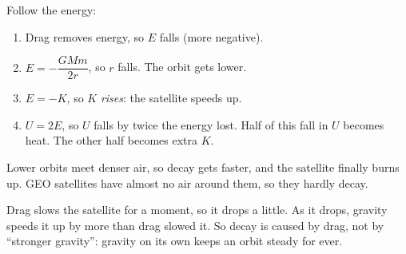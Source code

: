 \begin{sidebyside}[0.36]
  \centering
  \label{ch5:fig:decay}
\nextside
  Follow the energy:
  \begin{enumerate}
    \item Drag removes energy, so $E$ falls (more negative).
    \item $E = -\dfrac{GMm}{2r}$, so $r$ falls. The orbit gets lower.
    \item $E = -K$, so $K$ \emph{rises}: the satellite speeds up.
    \item $U = 2E$, so $U$ falls by twice the energy lost. Half of this fall in
          $U$ becomes heat. The other half becomes extra $K$.
  \end{enumerate}
  Lower orbits meet denser air, so decay gets faster, and the satellite finally
  burns up. GEO satellites have almost no air around them, so they hardly decay.
\end{sidebyside}

Drag slows the satellite for a moment, so it drops a little. As it drops,
gravity speeds it up by more than drag slowed it. So decay is caused by drag, not
by ``stronger gravity'': gravity on its own keeps an orbit steady for ever.

